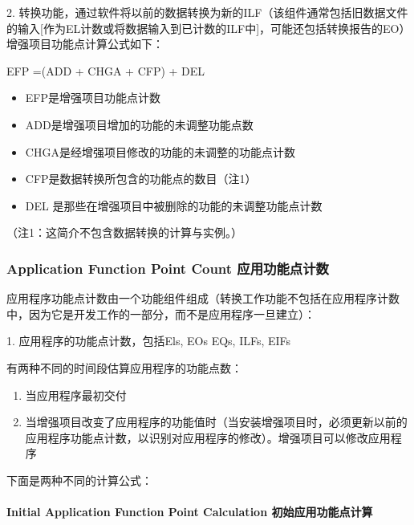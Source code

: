 2.
转换功能，通过软件将以前的数据转换为新的ILF（该组件通常包括旧数据文件的输入{[}作为EL计数或将数据输入到已计数的ILF中{]}，可能还包括转换报告的EO）\\
增强项目功能点计算公式如下：

EFP =(ADD + CHGA + CFP) + DEL

\begin{itemize}
\tightlist
\item
  EFP是增强项目功能点计数
\item
  ADD是增强项目增加的功能的未调整功能点数
\item
  CHGA是经增强项目修改的功能的未调整的功能点计数
\item
  CFP是数据转换所包含的功能点的数目（注1）
\item
  DEL 是那些在增强项目中被删除的功能的未调整功能点计数
\end{itemize}

\begin{description}
\tightlist
\item[]
（注1：这简介不包含数据转换的计算与实例。）
\end{description}

\hypertarget{application-function-point-count-ux5e94ux7528ux529fux80fdux70b9ux8ba1ux6570}{%
\subsubsection{Application Function Point Count
应用功能点计数}\label{application-function-point-count-ux5e94ux7528ux529fux80fdux70b9ux8ba1ux6570}}

应用程序功能点计数由一个功能组件组成（转换工作功能不包括在应用程序计数中，因为它是开发工作的一部分，而不是应用程序一旦建立）：

1. 应用程序的功能点计数，包括Els, EOs EQs, ILFs, EIFs

有两种不同的时间段估算应用程序的功能点数：

\begin{enumerate}
\tightlist
\item
  当应用程序最初交付
\item
  当增强项目改变了应用程序的功能值时（当安装增强项目时，必须更新以前的应用程序功能点计数，以识别对应用程序的修改）。增强项目可以修改应用程序
\end{enumerate}

下面是两种不同的计算公式：

\hypertarget{initial-application-function-point-calculation-ux521dux59cbux5e94ux7528ux529fux80fdux70b9ux8ba1ux7b97}{%
\paragraph{Initial Application Function Point Calculation
初始应用功能点计算}\label{initial-application-function-point-calculation-ux521dux59cbux5e94ux7528ux529fux80fdux70b9ux8ba1ux7b97}}

